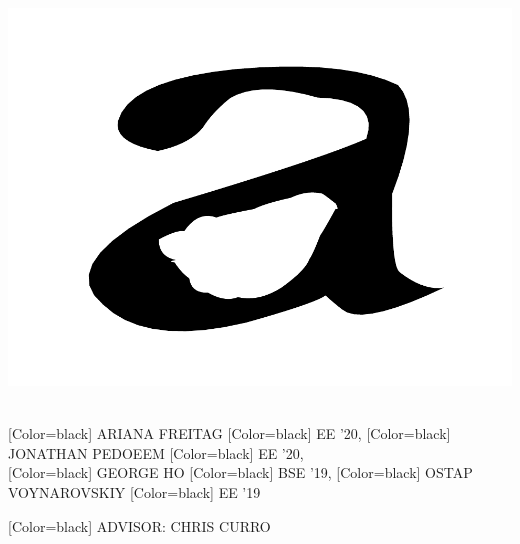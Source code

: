 \documentclass{article}
\begin{document}
{\begin{minipage}{21.5in}
\includegraphics[width=6.5in,trim=40 0 40 0,clip]{a6.pdf}
\end{minipage}
}
\vspace{0.5in}\\
{
[Color=black]
\fontsize{1in}{1em}\selectfont 
ARIANA FREITAG
}
{
[Color=black]
\fontsize{0.8in}{1em}\selectfont 
EE '20,
}
{
[Color=black]
\fontsize{1in}{1em}\selectfont 
JONATHAN PEDOEEM
}
{
[Color=black]
\fontsize{0.8in}{1em}\selectfont 
EE '20,
}\vspace{0.2in}\\
{
[Color=black]
\fontsize{1in}{1em}\selectfont 
GEORGE HO
}
{
[Color=black]
\fontsize{0.8in}{1em}\selectfont 
BSE '19,
} 
{
[Color=black]
\fontsize{1in}{1em}\selectfont 
OSTAP VOYNAROVSKIY
}
{
[Color=black]
\fontsize{0.8in}{1em}\selectfont 
EE '19
}


\vspace{0.2in}

{
[Color=black]
\fontsize{0.8in}{1em}\selectfont 
\noindent ADVISOR: CHRIS CURRO
}
\end{document}
